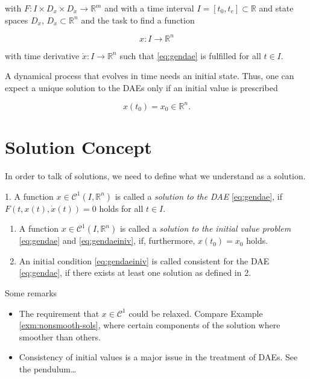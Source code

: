 \documentclass[]{book}
\providecommand{\tightlist}{%
  \setlength{\itemsep}{0pt}\setlength{\parskip}{0pt}}
\theoremstyle{definition}
\theoremstyle{definition}
\theoremstyle{definition}
\theoremstyle{remark}
\let\BeginKnitrBlock\begin \let\EndKnitrBlock\end
\begin{document}
with \(F\colon I \times D_x \times D_{\dot x} \to \mathbb R^m\) and with
a time interval \(I=[t_0,t_e] \subset \mathbb R\) and state spaces
\(D_x\), \(D_{\dot x} \subset \mathbb R^{n}\) and the task to find a
function

\begin{equation*}
    x \colon I \to \mathbb R^{n}
\end{equation*}

with time derivative \(\dot x \colon I \to \mathbb R^{n}\) such that
\eqref{eq:gendae} is fulfilled for all \(t\in I\).

A dynamical process that evolves in time needs an initial state. Thus,
one can expect a unique solution to the DAEs only if an initial value is
prescribed

\begin{equation}
    x(t_0) = x_0 \in \mathbb R^{n}. \label{eq:gendaeiniv} 
\end{equation}

\section{Solution Concept}\label{solution-concept}

In order to talk of solutions, we need to define what we understand as a
solution.

\BeginKnitrBlock{definition}
\protect\hypertarget{def:dae-solution}{}{\label{def:dae-solution} } 1. A
function \(x \in \mathcal C^1(I, \mathbb R^{n})\) is called a
\emph{solution to the DAE} \eqref{eq:gendae}, if
\(F(t, x(t), \dot x(t)) = 0\) holds for all \(t\in I\).

\begin{enumerate}
\def\labelenumi{\arabic{enumi}.}
\setcounter{enumi}{1}
\item
  A function \(x \in \mathcal C^1(I, \mathbb R^{n})\) is called a
  \emph{solution to the initial value problem} \eqref{eq:gendae} and
  \eqref{eq:gendaeiniv}, if, furthermore, \(x(t_0)= x_0\) holds.
\item
  An initial condition \eqref{eq:gendaeiniv} is called consistent for the
  DAE \eqref{eq:gendae}, if there exists at least one solution as defined
  in 2.
\end{enumerate}
\EndKnitrBlock{definition}

Some remarks

\begin{itemize}
\tightlist
\item
  The requirement that \(x \in \mathcal C^1\) could be relaxed. Compare
  Example \ref{exm:nonsmooth-sols}, where certain components of the
  solution where smoother than others.
\item
  Consistency of initial values is a major issue in the treatment of
  DAEs. See the pendulum\ldots{}
\end{itemize}
\end{document}
